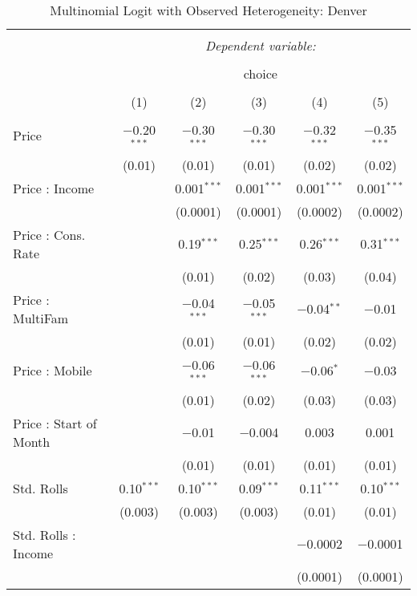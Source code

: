 
\begin{table}[!htbp] \centering 
  \caption{Multinomial Logit with Observed Heterogeneity: Denver} 
  \label{tab:mnlDenverObsHet} 
\begin{tabular}{@{\extracolsep{5pt}}lccccc} 
\\[-1.8ex]\hline 
\hline \\[-1.8ex] 
 & \multicolumn{5}{c}{\textit{Dependent variable:}} \\ 
\cline{2-6} 
\\[-1.8ex] & \multicolumn{5}{c}{choice} \\ 
\\[-1.8ex] & (1) & (2) & (3) & (4) & (5)\\ 
\hline \\[-1.8ex] 
 Price & $-$0.20$^{***}$ & $-$0.30$^{***}$ & $-$0.30$^{***}$ & $-$0.32$^{***}$ & $-$0.35$^{***}$ \\ 
  & (0.01) & (0.01) & (0.01) & (0.02) & (0.02) \\ 
  Price : Income &  & 0.001$^{***}$ & 0.001$^{***}$ & 0.001$^{***}$ & 0.001$^{***}$ \\ 
  &  & (0.0001) & (0.0001) & (0.0002) & (0.0002) \\ 
  Price : Cons. Rate &  & 0.19$^{***}$ & 0.25$^{***}$ & 0.26$^{***}$ & 0.31$^{***}$ \\ 
  &  & (0.01) & (0.02) & (0.03) & (0.04) \\ 
  Price : MultiFam &  & $-$0.04$^{***}$ & $-$0.05$^{***}$ & $-$0.04$^{**}$ & $-$0.01 \\ 
  &  & (0.01) & (0.01) & (0.02) & (0.02) \\ 
  Price : Mobile &  & $-$0.06$^{***}$ & $-$0.06$^{***}$ & $-$0.06$^{*}$ & $-$0.03 \\ 
  &  & (0.01) & (0.02) & (0.03) & (0.03) \\ 
  Price : Start of Month &  & $-$0.01 & $-$0.004 & 0.003 & 0.001 \\ 
  &  & (0.01) & (0.01) & (0.01) & (0.01) \\ 
  Std. Rolls & 0.10$^{***}$ & 0.10$^{***}$ & 0.09$^{***}$ & 0.11$^{***}$ & 0.10$^{***}$ \\ 
  & (0.003) & (0.003) & (0.003) & (0.01) & (0.01) \\ 
  Std. Rolls : Income &  &  &  & $-$0.0002 & $-$0.0001 \\ 
  &  &  &  & (0.0001) & (0.0001) \\ 

\end{tabular}
\end{table}

